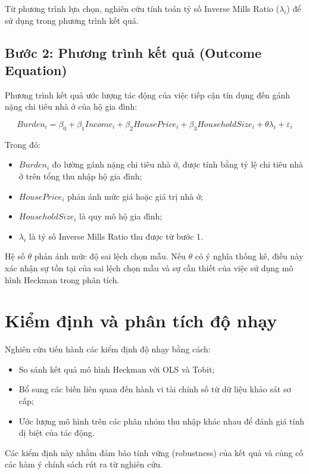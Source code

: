 \documentclass[12pt,a4paper]{report}
\begin{document}
	Từ phương trình lựa chọn, nghiên cứu tính toán tỷ số Inverse Mills Ratio ($\lambda_i$) để sử dụng trong phương trình kết quả.
	
	\subsection{Bước 2: Phương trình kết quả (Outcome Equation)}
	
	Phương trình kết quả ước lượng tác động của việc tiếp cận tín dụng đến gánh nặng chi tiêu nhà ở của hộ gia đình:
	
	\begin{equation}
		Burden_i = \beta_0 + \beta_1 Income_i + \beta_2 HousePrice_i + \beta_3 HouseholdSize_i + \theta \lambda_i + \varepsilon_i
	\end{equation}
	
	Trong đó:
	\begin{itemize}
		\item $Burden_i$ đo lường gánh nặng chi tiêu nhà ở, được tính bằng tỷ lệ chi tiêu nhà ở trên tổng thu nhập hộ gia đình;
		\item $HousePrice_i$ phản ánh mức giá hoặc giá trị nhà ở;
		\item $HouseholdSize_i$ là quy mô hộ gia đình;
		\item $\lambda_i$ là tỷ số Inverse Mills Ratio thu được từ bước 1.
	\end{itemize}
	
	Hệ số $\theta$ phản ánh mức độ sai lệch chọn mẫu. Nếu $\theta$ có ý nghĩa thống kê, điều này xác nhận sự tồn tại của sai lệch chọn mẫu và sự cần thiết của việc sử dụng mô hình Heckman trong phân tích.
	
	\section{Kiểm định và phân tích độ nhạy}
	
	Nghiên cứu tiến hành các kiểm định độ nhạy bằng cách:
	\begin{itemize}
		\item So sánh kết quả mô hình Heckman với OLS và Tobit;
		\item Bổ sung các biến liên quan đến hành vi tài chính số từ dữ liệu khảo sát sơ cấp;
		\item Ước lượng mô hình trên các phân nhóm thu nhập khác nhau để đánh giá tính dị biệt của tác động.
	\end{itemize}
	
	Các kiểm định này nhằm đảm bảo tính vững (robustness) của kết quả và củng cố các hàm ý chính sách rút ra từ nghiên cứu.
	
\end{document}

